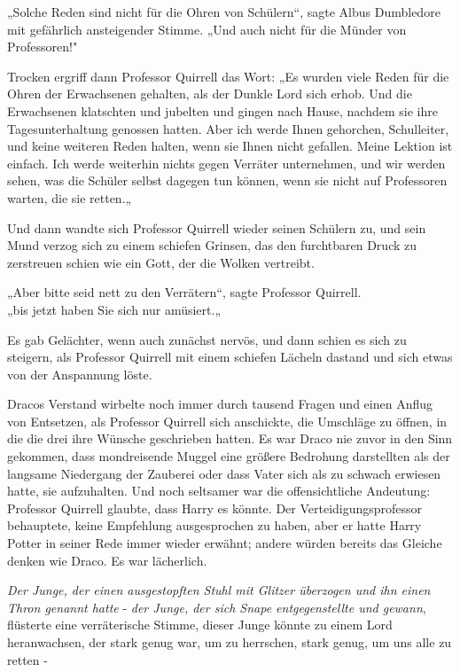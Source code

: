 {„Solche Reden sind nicht für die Ohren von Schülern“, sagte Albus Dumbledore mit gefährlich ansteigender Stimme. „Und auch nicht für die Münder von Professoren!"

Trocken ergriff dann Professor Quirrell das Wort: „Es wurden viele Reden für die Ohren der Erwachsenen gehalten, als der Dunkle Lord sich erhob. Und die Erwachsenen klatschten und jubelten und gingen nach Hause, nachdem sie ihre Tagesunterhaltung genossen hatten. Aber ich werde Ihnen gehorchen, Schulleiter, und keine weiteren Reden halten, wenn sie Ihnen nicht gefallen. Meine Lektion ist einfach. Ich werde weiterhin nichts gegen Verräter unternehmen, und wir werden sehen, was die Schüler selbst dagegen tun können, wenn sie nicht auf Professoren warten, die sie retten.„

Und dann wandte sich Professor Quirrell wieder seinen Schülern zu, und sein Mund verzog sich zu einem schiefen Grinsen, das den furchtbaren Druck zu zerstreuen schien wie ein Gott, der die Wolken vertreibt.

„Aber bitte seid nett zu den Verrätern“, sagte Professor Quirrell.\\ „bis jetzt haben Sie sich nur amüsiert.„

Es gab Gelächter, wenn auch zunächst nervös, und dann schien es sich zu steigern, als Professor Quirrell mit einem schiefen Lächeln dastand und sich etwas von der Anspannung löste.

Dracos Verstand wirbelte noch immer durch tausend Fragen und einen Anflug von Entsetzen, als Professor Quirrell sich anschickte, die Umschläge zu öffnen, in die die drei ihre Wünsche geschrieben hatten. Es war Draco nie zuvor in den Sinn gekommen, dass mondreisende Muggel eine größere Bedrohung darstellten als der langsame Niedergang der Zauberei oder dass Vater sich als zu schwach erwiesen hatte, sie aufzuhalten. Und noch seltsamer war die offensichtliche Andeutung: Professor Quirrell glaubte, dass Harry es könnte. Der Verteidigungsprofessor behauptete, keine Empfehlung ausgesprochen zu haben, aber er hatte Harry Potter in seiner Rede immer wieder erwähnt; andere würden bereits das Gleiche denken wie Draco. Es war lächerlich.

\emph{Der Junge, der einen ausgestopften Stuhl mit Glitzer überzogen und ihn einen Thron genannt hatte} - \emph{der Junge, der sich Snape entgegenstellte und gewann}, flüsterte eine verräterische Stimme, dieser Junge könnte zu einem Lord heranwachsen, der stark genug war, um zu herrschen, stark genug, um uns alle zu retten -

}

